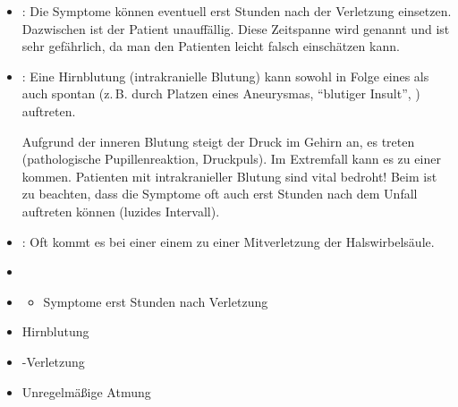 
{
\begin{itemize}
  \item {}:
  Die
  Symptome können eventuell erst Stunden nach der Verletzung
  einsetzen. Dazwischen ist der Patient unauffällig.
  Diese Zeitspanne wird  genannt und ist sehr gefährlich, da man den
  Patienten leicht falsch einschätzen kann.
  \item {}:
  Eine Hirnblutung (intrakranielle Blutung) kann sowohl in
  Folge eines  als auch spontan (z.\,B. durch Platzen eines
  Aneurysmas, \enquote{blutiger Insult}, )
  auftreten.
  
  Aufgrund der inneren Blutung steigt der Druck im Gehirn
  an, es treten  (pathologische
  Pupillenreaktion, Druckpuls). Im Extremfall kann es zu
  einer  kommen. Patienten mit
  intrakranieller Blutung sind vital bedroht! Beim 
  ist zu beachten, dass die Symptome oft auch erst Stunden
  nach dem Unfall auftreten können (luzides Intervall).
  \item {}:
  Oft kommt es bei einer einem  zu einer
  Mitverletzung der Halswirbelsäule.
  \item {}
\end{itemize}

}{
\begin{itemize}
  \item {}
  \begin{itemize}
    \item Symptome erst Stunden nach Verletzung
  \end{itemize}
  \item Hirnblutung 
  \item {}-Verletzung
  \item Unregelmäßige Atmung
\end{itemize}
}{}{}{}


